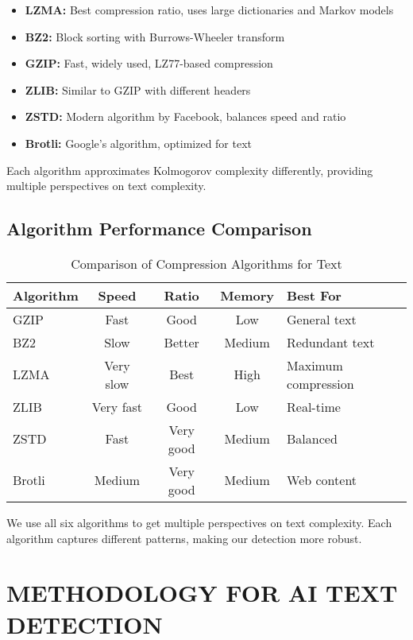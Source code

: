 \documentclass[12pt,a4paper]{report}
\begin{document}
\begin{itemize}
    \item \textbf{LZMA:} Best compression ratio, uses large dictionaries and Markov models
    \item \textbf{BZ2:} Block sorting with Burrows-Wheeler transform
    \item \textbf{GZIP:} Fast, widely used, LZ77-based compression
    \item \textbf{ZLIB:} Similar to GZIP with different headers
    \item \textbf{ZSTD:} Modern algorithm by Facebook, balances speed and ratio
    \item \textbf{Brotli:} Google's algorithm, optimized for text
\end{itemize}

Each algorithm approximates Kolmogorov complexity differently, providing multiple perspectives on text complexity.

\section{Algorithm Performance Comparison}

\begin{table}[h]
\centering
\caption{Comparison of Compression Algorithms for Text}
\begin{tabular}{lcccl}
\toprule
\textbf{Algorithm} & \textbf{Speed} & \textbf{Ratio} & \textbf{Memory} & \textbf{Best For} \\
\midrule
GZIP & Fast & Good & Low & General text \\
BZ2 & Slow & Better & Medium & Redundant text \\
LZMA & Very slow & Best & High & Maximum compression \\
ZLIB & Very fast & Good & Low & Real-time \\
ZSTD & Fast & Very good & Medium & Balanced \\
Brotli & Medium & Very good & Medium & Web content \\
\bottomrule
\end{tabular}
\end{table}

We use all six algorithms to get multiple perspectives on text complexity. Each algorithm captures different patterns, making our detection more robust.

\chapter{METHODOLOGY FOR AI TEXT DETECTION}
\end{document}
